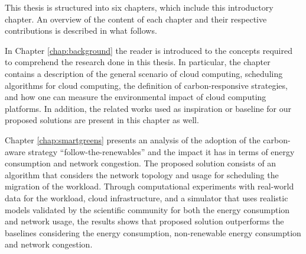 This thesis is structured into six chapters, which include this introductory chapter. An overview of the content of each chapter and their respective contributions is described in what follows.

In Chapter \ref{chap:background} the reader is introduced to the concepts required to comprehend the research done in this thesis. In particular, the chapter contains a description of the general scenario of cloud computing, scheduling algorithms for cloud computing, the definition of carbon-responsive strategies, and how one can measure the environmental impact of cloud computing platforms. In addition, the related works used as inspiration or baseline for our proposed solutions are present in this chapter as well.

Chapter \ref{chap:smartgreens} presents an analysis of the adoption of the carbon-aware strategy ``follow-the-renewables'' and the impact it has in terms of energy consumption and network congestion. The proposed solution consists of an algorithm that considers the network topology and usage for scheduling the migration of the workload. Through computational experiments with real-world data for the workload, cloud infrastructure, and a simulator that uses realistic models validated by the scientific community for both the energy consumption and network usage, the results shows that proposed solution outperforms the baselines considering the energy consumption, non-renewable energy consumption and network congestion. 

